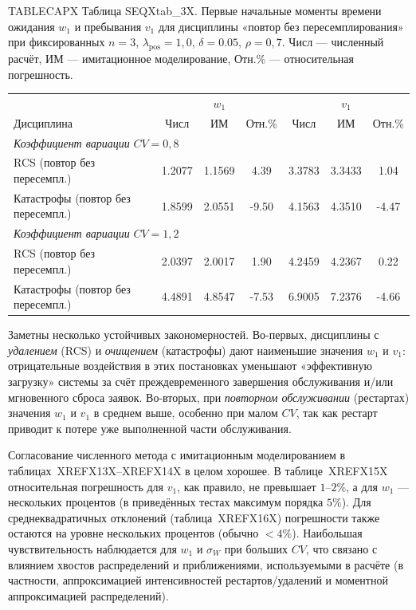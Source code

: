 \noindent TABLECAPX Таблица SEQXtab_3X. Первые начальные моменты времени ожидания \(w_1\) и пребывания \(v_1\) для дисциплины «повтор без пересемплирования» при фиксированных \(n=3\), \(\lambda_{\text{pos}}=1{,}0\), \(\delta=0.05\), \(\rho=0{,}7\). Числ --- численный расчёт, ИМ --- имитационное моделирование, Отн.\% --- относительная погрешность.\par



\begin{tabular}{lcccccc}
\toprule
 & \multicolumn{3}{c}{$w_1$} & \multicolumn{3}{c}{$v_1$} \\
 
Дисциплина & Числ & ИМ & Отн.\% & Числ & ИМ & Отн.\% \\
\midrule
\multicolumn{7}{l}{\textit{Коэффициент вариации} $CV=0{,}8$} \\
RCS (повтор без пересемпл.) & 1.2077 & 1.1569 & 4.39 & 3.3783 & 3.3433 & 1.04 \\
Катастрофы (повтор без пересемпл.) & 1.8599 & 2.0551 & -9.50 & 4.1563 & 4.3510 & -4.47 \\
\midrule
\multicolumn{7}{l}{\textit{Коэффициент вариации} $CV=1{,}2$} \\
RCS (повтор без пересемпл.) & 2.0397 & 2.0017 & 1.90 & 4.2459 & 4.2367 & 0.22 \\
Катастрофы (повтор без пересемпл.) & 4.4891 & 4.8547 & -7.53 & 6.9005 & 7.2376 & -4.66 \\
\bottomrule
\end{tabular}





Заметны несколько устойчивых закономерностей. Во-первых, дисциплины с \emph{удалением} (RCS) и \emph{очищением} (катастрофы) дают наименьшие значения \(w_1\) и \(v_1\): отрицательные воздействия в этих постановках уменьшают «эффективную загрузку» системы за счёт преждевременного завершения обслуживания и/или мгновенного сброса заявок. Во-вторых, при \emph{повторном обслуживании} (рестартах) значения \(w_1\) и \(v_1\) в среднем выше, особенно при малом \(CV\), так как рестарт приводит к потере уже выполненной части обслуживания.

Согласование численного метода с имитационным моделированием в таблицах~XREFX13X--XREFX14X в целом хорошее. В таблице~XREFX15X относительная погрешность для \(v_1\), как правило, не превышает \(1\text{--}2\%\), а для \(w_1\) --- нескольких процентов (в приведённых тестах максимум порядка \(5\%\)). Для среднеквадратичных отклонений (таблица~XREFX16X) погрешности также остаются на уровне нескольких процентов (обычно \(<4\%\)). Наибольшая чувствительность наблюдается для \(w_1\) и \(\sigma_W\) при больших \(CV\), что связано с влиянием хвостов распределений и приближениями, используемыми в расчёте (в частности, аппроксимацией интенсивностей рестартов/удалений и моментной аппроксимацией распределений).

